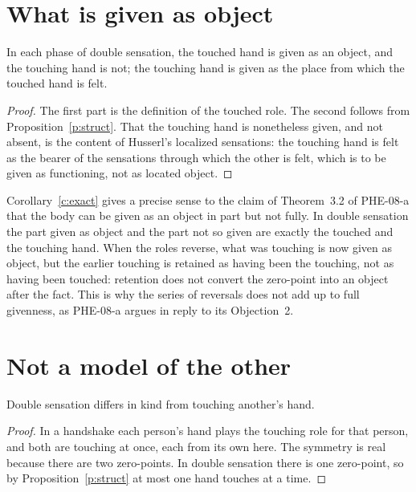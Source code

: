 \documentclass{situationist-preprint}
\begin{document}
\section{What is given as object}

\begin{corollary}\label{c:exact}
In each phase of double sensation, the touched hand is given as an object, and the touching hand is not; the touching hand is given as the place from which the touched hand is felt.
\end{corollary}

\begin{proof}
The first part is the definition of the touched role. The second follows from Proposition~\ref{p:struct}. That the touching hand is nonetheless given, and not absent, is the content of Husserl's localized sensations: the touching hand is felt as the bearer of the sensations through which the other is felt, which is to be given as functioning, not as located object.
\end{proof}

Corollary~\ref{c:exact} gives a precise sense to the claim of Theorem~3.2 of PHE-08-a that the body can be given as an object in part but not fully. In double sensation the part given as object and the part not so given are exactly the touched and the touching hand. When the roles reverse, what was touching is now given as object, but the earlier touching is retained as having been the touching, not as having been touched: retention does not convert the zero-point into an object after the fact. This is why the series of reversals does not add up to full givenness, as PHE-08-a argues in reply to its Objection~2.

\section{Not a model of the other}

\begin{corollary}\label{c:other}
Double sensation differs in kind from touching another's hand.
\end{corollary}

\begin{proof}
In a handshake each person's hand plays the touching role for that person, and both are touching at once, each from its own here. The symmetry is real because there are two zero-points. In double sensation there is one zero-point, so by Proposition~\ref{p:struct} at most one hand touches at a time.
\end{proof}
\end{document}
